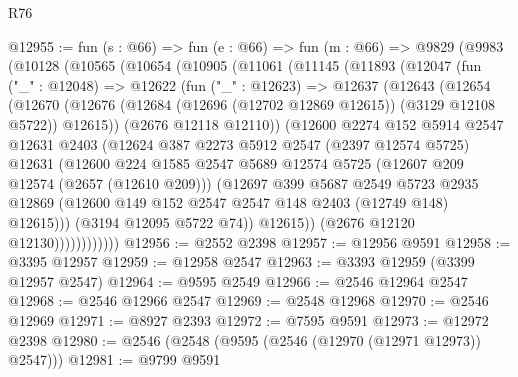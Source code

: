 \begin{lexlean}{R76}
\begin{coremodule}
@12955 := fun (s : @66) =>
  fun (e : @66) =>
  fun (m : @66) =>
  @9829
    (@9983
      (@10128
        (@10565
          (@10654
            (@10905
              (@11061
                (@11145
                  (@11893
                    (@12047
                      (fun ("_" : @12048) =>
                      @12622
                        (fun ("_" : @12623) =>
                        @12637
                          (@12643
                            (@12654
                              (@12670
                                (@12676
                                  (@12684 (@12696 (@12702 @12869 @12615)) (@3129 @12108 @5722))
                                  @12615))
                              (@2676 @12118 @12110))
                            (@12600
                              @2274
                              @152
                              @5914
                              @2547
                              @12631
                              @2403
                              (@12624
                                @387
                                @2273
                                @5912
                                @2547
                                (@2397 @12574 @5725)
                                @12631
                                (@12600
                                  @224
                                  @1585
                                  @2547
                                  @5689
                                  @12574
                                  @5725
                                  (@12607 @209 @12574 (@2657 (@12610 @209)))
                                  (@12697
                                    @399
                                    @5687
                                    @2549
                                    @5723
                                    @2935
                                    @12869
                                    (@12600 @149 @152 @2547 @2547 @148 @2403 (@12749 @148) @12615)))
                                (@3194 @12095 @5722 @74))
                              @12615))
                          (@2676 @12120 @12130))))))))))))
@12956 := @2552 @2398
@12957 := @12956 @9591
@12958 := @3395 @12957
@12959 := @12958 @2547
@12963 := @3393 @12959 (@3399 @12957 @2547)
@12964 := @9595 @2549
@12966 := @2546 @12964 @2547
@12968 := @2546 @12966 @2547
@12969 := @2548 @12968
@12970 := @2546 @12969
@12971 := @8927 @2393
@12972 := @7595 @9591
@12973 := @12972 @2398
@12980 := @2546 (@2548 (@9595 (@2546 (@12970 (@12971 @12973)) @2547)))
@12981 := @9799 @9591

\end{coremodule}
\end{lexlean}
